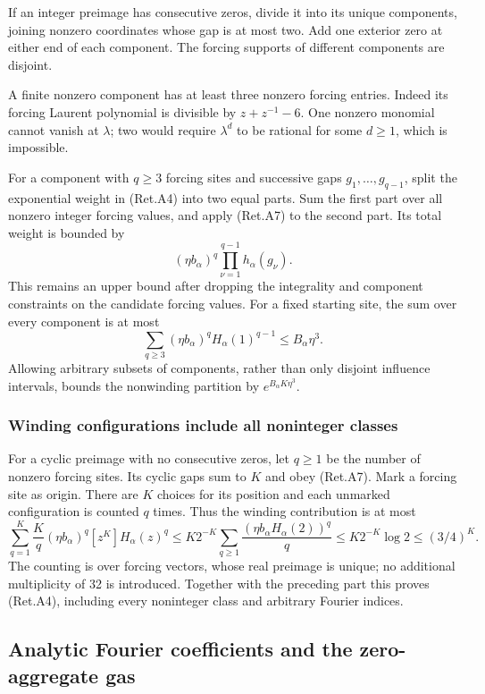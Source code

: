 If an integer preimage has consecutive zeros, divide it into its unique
components, joining nonzero coordinates whose gap is at most two.
Add one exterior zero at either end of each component.
The forcing supports of different components are disjoint.

A finite nonzero component has at least three nonzero forcing entries.
Indeed its forcing Laurent polynomial is divisible by \(z+z^{-1}-6\).
One nonzero monomial cannot vanish at \(\lambda\); two would require
\(\lambda^d\) to be rational for some \(d\ge1\), which is impossible.

For a component with \(q\ge3\) forcing sites and successive gaps
\(g_1,\ldots,g_{q-1}\), split the exponential weight in (Ret.A4) into two
equal parts. Sum the first part over all nonzero integer forcing
values, and apply (Ret.A7) to the second part. Its total weight is bounded by
\[
 (\eta b_\alpha)^q\prod_{\nu=1}^{q-1}h_\alpha(g_\nu).
\]
This remains an upper bound after dropping the integrality and component
constraints on the candidate forcing values.
For a fixed starting site, the sum over every component is at most
\[
 \sum_{q\ge3}(\eta b_\alpha)^qH_\alpha(1)^{q-1}
 \le B_\alpha\eta^3.
\]
Allowing arbitrary subsets of components, rather than only disjoint
influence intervals, bounds the nonwinding partition by
\(e^{B_\alpha K\eta^3}\).

\hypertarget{winding-configurations-include-all-noninteger-classes}{%
\subsubsection{Winding configurations include all noninteger classes}\label{winding-configurations-include-all-noninteger-classes}}

For a cyclic preimage with no consecutive zeros, let \(q\ge1\)
be the number of nonzero forcing sites.
Its cyclic gaps sum to \(K\) and obey (Ret.A7).
Mark a forcing site as origin. There are \(K\) choices for its position
and each unmarked configuration is counted \(q\) times. Thus the
winding contribution is at most
\[
 \sum_{q=1}^K\frac Kq(\eta b_\alpha)^q
                   [z^K]H_\alpha(z)^q
 \le K2^{-K}\sum_{q\ge1}\frac{(\eta b_\alpha H_\alpha(2))^q}{q}
 \le K2^{-K}\log2\le(3/4)^K.
\]
The counting is over forcing vectors, whose real preimage is unique;
no additional multiplicity of 32 is introduced.
Together with the preceding part this proves (Ret.A4), including every
noninteger class and arbitrary Fourier indices.

\hypertarget{analytic-fourier-coefficients-and-the-zero-aggregate-gas}{%
\subsection{Analytic Fourier coefficients and the zero-aggregate gas}\label{analytic-fourier-coefficients-and-the-zero-aggregate-gas}}

